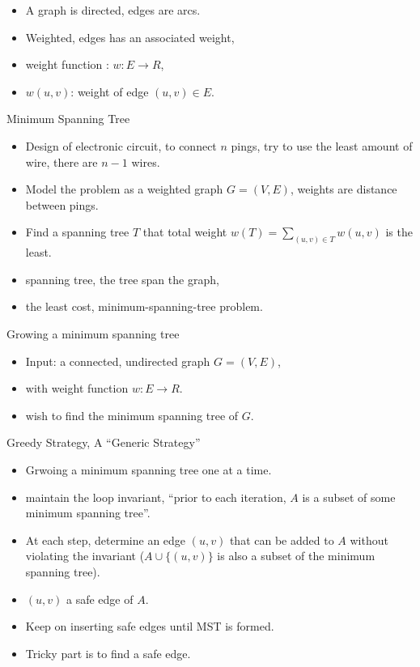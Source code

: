 \documentclass{beamer}
\begin{document}
\begin{frame}{}

\begin{itemize}
\item A graph is directed, edges are arcs.  
\item Weighted, edges has an associated weight, 
\item weight function : $w:E\rightarrow R$,
\item $w(u,v)$: weight of edge $(u,v)\in E$. 
\end{itemize}
\end{frame}

\begin{frame}{}

\centerline{\Large Minimum Spanning Tree}
\begin{itemize}
\item Design of electronic circuit, to connect $n$ pings, try to use the least 
 amount of wire, there are $n-1$ wires.
\item Model the problem as a weighted graph $G=(V,E)$,
 weights are distance between pings.  
\item Find a spanning tree $T$ that total weight $w(T)=\sum_{(u,v)\in T}w(u,v)$
 is the least.  
\item spanning tree, the tree span the graph,
\item the least cost, minimum-spanning-tree problem.  
\end{itemize}
\end{frame}

\begin{frame}{}

\centerline{Growing a minimum spanning tree}
\begin{itemize}
\item Input: a connected, undirected graph $G=(V,E)$,
\item with weight function $w:E\rightarrow R$. 
\item wish to find the minimum spanning tree of $G$. 
\end{itemize}
\end{frame}

\begin{frame}{}

\centerline{Greedy Strategy, A ``Generic Strategy''}
\begin{itemize}
\item Grwoing a minimum spanning tree one at a time. 
\item maintain the loop invariant, ``prior to each iteration, $A$ is a subset of some minimum spanning tree''. 
\item At each step, determine an edge $(u,v)$ that can be added to $A$ without violating the invariant ($A\cup \{(u,v)\}$ is also a subset of the
 minimum spanning tree). 
\item $(u,v)$ a safe edge of $A$. 
\item Keep on inserting safe edges until MST is formed. 
\item Tricky part is to find a safe edge. 
\end{itemize}
\end{frame}
\end{document}
